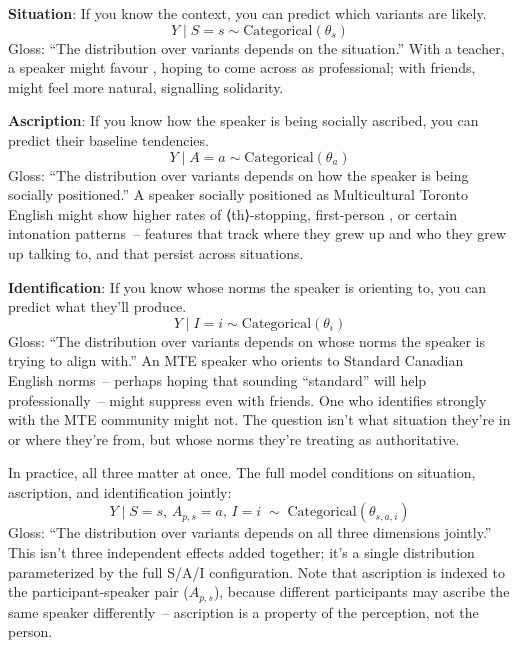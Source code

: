 \documentclass[11pt,letterpaper]{article}
\begin{document}
\textbf{Situation}: If you know the context, you can predict which variants are likely.
\begin{equation}
    Y \mid S = s \sim \text{Categorical}(\theta_s)
\end{equation}
Gloss: \enquote{The distribution over variants depends on the situation.} With a teacher, a speaker might favour , hoping to come across as professional; with friends,  might feel more natural, signalling solidarity.

\textbf{Ascription}: If you know how the speaker is being socially ascribed, you can predict their baseline tendencies.
\begin{equation}
    Y \mid A = a \sim \text{Categorical}(\theta_a)
\end{equation}
Gloss: \enquote{The distribution over variants depends on how the speaker is being socially positioned.} A speaker socially positioned as Multicultural Toronto English might show higher rates of ⟨th⟩-stopping, first-person , or certain intonation patterns~-- features that track where they grew up and who they grew up talking to, and that persist across situations.

\textbf{Identification}: If you know whose norms the speaker is orienting to, you can predict what they'll produce.
\begin{equation}
    Y \mid I = i \sim \text{Categorical}(\theta_i)
\end{equation}
Gloss: \enquote{The distribution over variants depends on whose norms the speaker is trying to align with.} An MTE speaker who orients to Standard Canadian English norms~-- perhaps hoping that sounding \enquote{standard} will help professionally~-- might suppress  even with friends. One who identifies strongly with the MTE community might not. The question isn't what situation they're in or where they're from, but whose norms they're treating as authoritative.

In practice, all three matter at once. The full model conditions on situation, ascription, and identification jointly:
\begin{equation}
    Y \mid S{=}s,\, A_{p,s}{=}a,\, I{=}i \;\sim\; \text{Categorical}(\theta_{s,a,i})
\end{equation}
Gloss: \enquote{The distribution over variants depends on all three dimensions jointly.} This isn't three independent effects added together; it's a single distribution parameterized by the full S/A/I configuration. Note that ascription is indexed to the participant-speaker pair ($A_{p,s}$), because different participants may ascribe the same speaker differently~-- ascription is a property of the perception, not the person.
\end{document}
